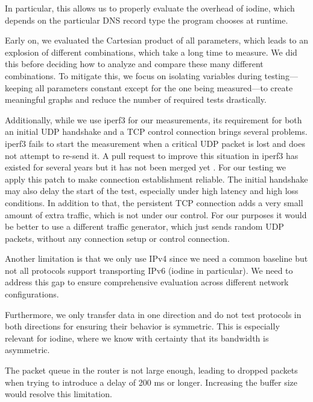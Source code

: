 In particular, this allows us to properly evaluate the overhead of iodine, which depends on the particular DNS record type the program chooses at runtime.

Early on, we evaluated the Cartesian product of all parameters, which leads to an explosion of different combinations, which take a long time to measure.
We did this before deciding how to analyze and compare these many different combinations.
To mitigate this, we focus on isolating variables during testing—keeping all parameters constant except for the one being measured—to create meaningful graphs and reduce the number of required tests drastically.

Additionally, while we use iperf3 for our measurements, its requirement for both an initial UDP handshake and a TCP control connection brings several problems.
iperf3 fails to start the measurement when a critical UDP packet is lost and does not attempt to re-send it.
A pull request to improve this situation in iperf3 has existed for several years but it has not been merged yet \cite{iperf-udp-connect-retry}.
For our testing we apply this patch to make connection establishment reliable.
The initial handshake may also delay the start of the test, especially under high latency and high loss conditions.
In addition to that, the persistent TCP connection adds a very small amount of extra traffic, which is not under our control.
For our purposes it would be better to use a different traffic generator, which just sends random UDP packets, without any connection setup or control connection.

Another limitation is that we only use IPv4 since we need a common baseline but not all protocols support transporting IPv6 (iodine in particular).
We need to address this gap to ensure comprehensive evaluation across different network configurations.

Furthermore, we only transfer data in one direction and do not test protocols in both directions for ensuring their behavior is symmetric.
This is especially relevant for iodine, where we know with certainty that its bandwidth is asymmetric.

The packet queue in the router is not large enough, leading to dropped packets when trying to introduce a delay of 200 ms or longer.
Increasing the buffer size would resolve this limitation.

